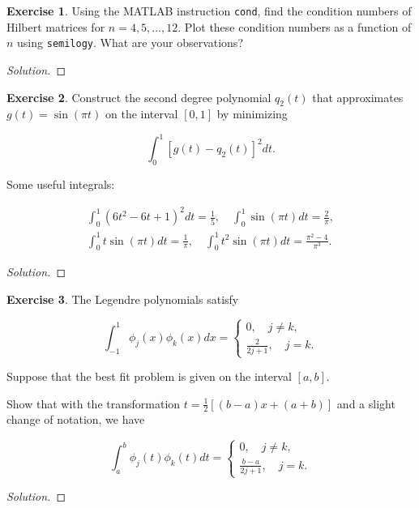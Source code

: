 \documentclass[12pt,a4]{article}
\theoremstyle{definition}
\newtheorem{exercise}{Exercise}
\begin{document}
\begin{exercise}
	Using the MATLAB instruction \texttt{cond}, find the condition numbers of Hilbert matrices for $n = 4, 5, \ldots, 12$. Plot these condition numbers as a function of $n$ using \texttt{semilogy}. What are your observations?
\end{exercise}
\begin{proof}[Solution]
	
\end{proof}

\begin{exercise}
	Construct the second degree polynomial $q_2(t)$ that approximates $g(t) = \sin(\pi t)$ on the interval $[0, 1]$ by minimizing 
	
	\[
	\int_0^1 [g(t) - q_2(t)]^2 dt {.}
	\]
	
	\noindent Some useful integrals:
	
	\begin{gather}
	\int_0^1 (6 t^2 - 6 t + 1)^2 dt = \frac{1}{5} {,} \quad \int_0^1 \sin(\pi t) dt = \frac{2}{\pi} {,} \\
	\int_0^1 t \sin(\pi t) dt = \frac{1}{\pi} {,} \quad \int_0^1 t^2 \sin(\pi t) dt = \frac{\pi^2 - 4}{\pi^3} {.}
	\end{gather}
\end{exercise}
\begin{proof}[Solution]
	
\end{proof}

\begin{exercise}
	The Legendre polynomials satisfy 
	
	\[
	\int_{-1}^{1} \phi_j(x) \phi_k(x) dx = \begin{cases}
	0 {,} \quad j \neq k {,} \\
	\frac{2}{2 j + 1} {,} \quad j = k {.}
	\end{cases}
	\]
	
	\noindent Suppose that the best fit problem is given on the interval $[a, b]$. 
	
	Show that with the transformation $t = \frac{1}{2} [(b - a) x + (a + b)]$ and a slight change of notation, we have 
	
	\[
	\int_a^b \phi_j(t) \phi_k(t) dt = \begin{cases}
	0 {,} \quad j \neq k {,} \\
	\frac{b - a}{2 j + 1} {,} \quad j = k {.}
	\end{cases}
	\]
\end{exercise}
\begin{proof}[Solution]
	
\end{proof}
\end{document}
